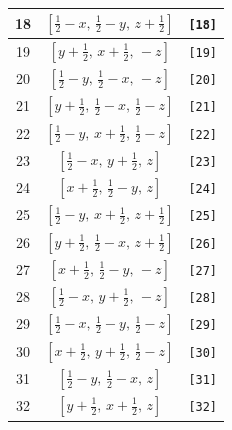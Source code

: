 \documentclass[fleqn,8pt]{jsarticle}
\begin{document}
\begin{longtable}{ccc}
18 & $\left[ \frac{1}{2} - x,\, \frac{1}{2} - y,\, z + \frac{1}{2} \right]$ & {\tt [18]} \\ \hline
19 & $\left[ y + \frac{1}{2},\, x + \frac{1}{2},\, - z \right]$ & {\tt [19]} \\ \hline
20 & $\left[ \frac{1}{2} - y,\, \frac{1}{2} - x,\, - z \right]$ & {\tt [20]} \\ \hline
21 & $\left[ y + \frac{1}{2},\, \frac{1}{2} - x,\, \frac{1}{2} - z \right]$ & {\tt [21]} \\ \hline
22 & $\left[ \frac{1}{2} - y,\, x + \frac{1}{2},\, \frac{1}{2} - z \right]$ & {\tt [22]} \\ \hline
23 & $\left[ \frac{1}{2} - x,\, y + \frac{1}{2},\, z \right]$ & {\tt [23]} \\ \hline
24 & $\left[ x + \frac{1}{2},\, \frac{1}{2} - y,\, z \right]$ & {\tt [24]} \\ \hline
25 & $\left[ \frac{1}{2} - y,\, x + \frac{1}{2},\, z + \frac{1}{2} \right]$ & {\tt [25]} \\ \hline
26 & $\left[ y + \frac{1}{2},\, \frac{1}{2} - x,\, z + \frac{1}{2} \right]$ & {\tt [26]} \\ \hline
27 & $\left[ x + \frac{1}{2},\, \frac{1}{2} - y,\, - z \right]$ & {\tt [27]} \\ \hline
28 & $\left[ \frac{1}{2} - x,\, y + \frac{1}{2},\, - z \right]$ & {\tt [28]} \\ \hline
29 & $\left[ \frac{1}{2} - x,\, \frac{1}{2} - y,\, \frac{1}{2} - z \right]$ & {\tt [29]} \\ \hline
30 & $\left[ x + \frac{1}{2},\, y + \frac{1}{2},\, \frac{1}{2} - z \right]$ & {\tt [30]} \\ \hline
31 & $\left[ \frac{1}{2} - y,\, \frac{1}{2} - x,\, z \right]$ & {\tt [31]} \\ \hline
32 & $\left[ y + \frac{1}{2},\, x + \frac{1}{2},\, z \right]$ & {\tt [32]} \\
\end{longtable}
\end{document}
